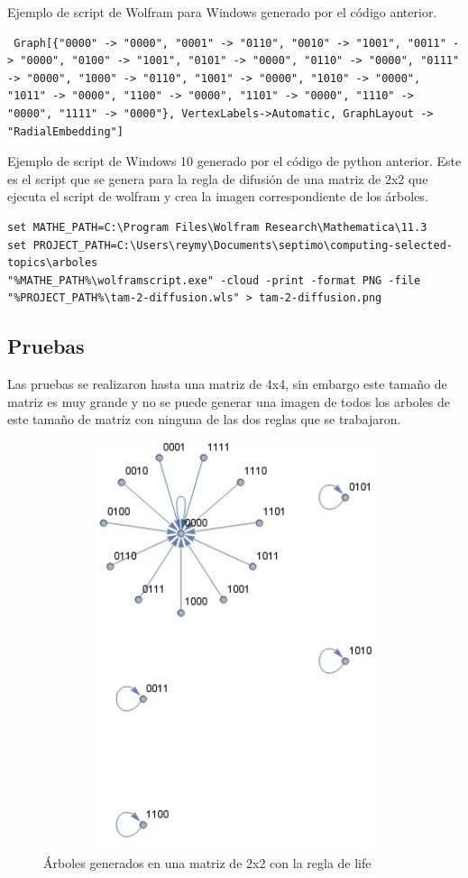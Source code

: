 Ejemplo de script de Wolfram para Windows generado por el código anterior.
\begin{lstlisting}
 Graph[{"0000" -> "0000", "0001" -> "0110", "0010" -> "1001", "0011" -> "0000", "0100" -> "1001", "0101" -> "0000", "0110" -> "0000", "0111" -> "0000", "1000" -> "0110", "1001" -> "0000", "1010" -> "0000", "1011" -> "0000", "1100" -> "0000", "1101" -> "0000", "1110" -> "0000", "1111" -> "0000"}, VertexLabels->Automatic, GraphLayout -> "RadialEmbedding"]
\end{lstlisting}

Ejemplo de script de Windows 10 generado por el código de python anterior. Este es el script que se genera para la regla de difusión de una matriz de 2x2  que ejecuta el script de wolfram y crea la imagen correspondiente de los árboles.
\begin{lstlisting}
set MATHE_PATH=C:\Program Files\Wolfram Research\Mathematica\11.3
set PROJECT_PATH=C:\Users\reymy\Documents\septimo\computing-selected-topics\arboles
"%MATHE_PATH%\wolframscript.exe" -cloud -print -format PNG -file "%PROJECT_PATH%\tam-2-diffusion.wls" > tam-2-diffusion.png
\end{lstlisting}
\subsection{Pruebas}
Las pruebas se realizaron hasta una matriz de 4x4, sin embargo este tamaño de matriz es muy grande y no se puede generar una imagen de todos los arboles de este tamaño de matriz con ninguna de las dos reglas que se trabajaron.

\begin{figure}[H]
\begin{center}
 \includegraphics[width=12cm, height=12cm]{./img/tam-2-life.png}
 \caption{Árboles generados en una matriz de 2x2 con la regla de life}
 \label{fig:life2}
\end{center}
\end{figure}

